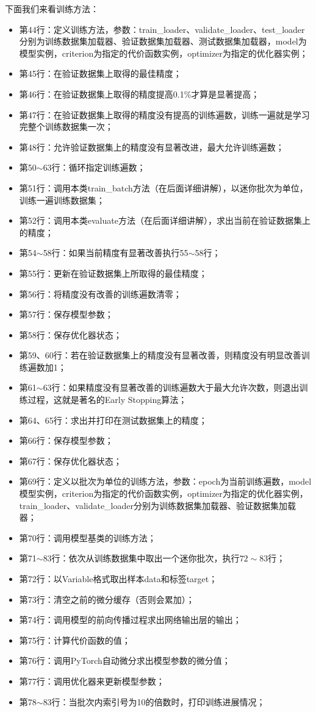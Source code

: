 \documentclass[UTF8]{article}
\begin{document}
下面我们来看训练方法：
\begin{itemize}
\item 第44行：定义训练方法，参数：train\_loader、validate\_loader、test\_loader分别为训练数据集加载器、验证数据集加载器、测试数据集加载器，model为模型实例，criterion为指定的代价函数实例，optimizer为指定的优化器实例；
\item 第45行：在验证数据集上取得的最佳精度；
\item 第46行：在验证数据集上取得的精度提高0.1\%才算是显著提高；
\item 第47行：在验证数据集上取得的精度没有提高的训练遍数，训练一遍就是学习完整个训练数据集一次；
\item 第48行：允许验证数据集上的精度没有显著改进，最大允许训练遍数；
\item 第50$\sim$63行：循环指定训练遍数；
\item 第51行：调用本类train\_batch方法（在后面详细讲解），以迷你批次为单位，训练一遍训练数据集；
\item 第52行：调用本类evaluate方法（在后面详细讲解），求出当前在验证数据集上的精度；
\item 第54$\sim$58行：如果当前精度有显著改善执行55$\sim$58行；
\item 第55行：更新在验证数据集上所取得的最佳精度；
\item 第56行：将精度没有改善的训练遍数清零；
\item 第57行：保存模型参数；
\item 第58行：保存优化器状态；
\item 第59、60行：若在验证数据集上的精度没有显著改善，则精度没有明显改善训练遍数加1；
\item 第61$\sim$63行：如果精度没有显著改善的训练遍数大于最大允许次数，则退出训练过程，这就是著名的Early Stopping算法；
\item 第64、65行：求出并打印在测试数据集上的精度；
\item 第66行：保存模型参数；
\item 第67行：保存优化器状态；
\item 第69行：定义以批次为单位的训练方法，参数：epoch为当前训练遍数，model模型实例，criterion为指定的代价函数实例，optimizer为指定的优化器实例，train\_loader、validate\_loader分别为训练数据集加载器、验证数据集加载器；
\item 第70行：调用模型基类的训练方法；
\item 第71$\sim$83行：依次从训练数据集中取出一个迷你批次，执行$72 \sim 83$行；
\item 第72行：以Variable格式取出样本data和标签target；
\item 第73行：清空之前的微分缓存（否则会累加）；
\item 第74行：调用模型的前向传播过程求出网络输出层的输出；
\item 第75行：计算代价函数的值；
\item 第76行：调用PyTorch自动微分求出模型参数的微分值；
\item 第77行：调用优化器来更新模型参数；
\item 第78$\sim$83行：当批次内索引号为10的倍数时，打印训练进展情况；
\end{itemize}
\end{document}
